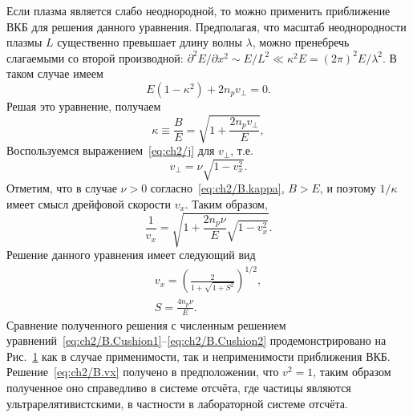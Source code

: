 Если плазма является слабо неоднородной, то можно применить приближение ВКБ для решения данного уравнения.
Предполагая, что масштаб неоднородности плазмы $L$ существенно превышает длину волны $\lambda$, можно пренебречь слагаемыми со второй производной: ${\partial^2E/\partial x^2 \sim E/L^2 \ll \kappa^2 E = (2\pi)^2E/\lambda^2}$.
В таком случае имеем
\begin{equation}
    E(1-\kappa^2)+2 n_p v_{\perp} = 0.
\end{equation}
Решая это уравнение, получаем
\begin{equation}
    \label{eq:ch2/B.kappa}
    \kappa \equiv \frac{B}{E}=\sqrt{1+\frac{2 n_p v_{\perp}}{E}},
\end{equation}
Воспользуемся выражением~\eqref{eq:ch2/j} для $v_\perp$, т.е.
\begin{equation}
v_\perp = \nu \sqrt{1-v_x^2}.
\label{vp}
\end{equation}
Отметим, что в случае $\nu>0$ согласно~\eqref{eq:ch2/B.kappa}, $B>E$, и поэтому $1/\kappa$ имеет смысл дрейфовой скорости $v_x$.
Таким образом,
\begin{equation}
    \frac{1}{v_x}=\sqrt{1+\frac{2n_p\nu}{E}\sqrt{1-v_x^2}} .
\end{equation}
Решение данного уравнения имеет следующий вид
\begin{gather}
    \label{eq:ch2/B.vx}
    v_x= {\left( \frac{2}{1+\sqrt{1+S^2}} \right)}^{1/2},\\
    S=\frac{4n_p\nu}{E}.
\end{gather}
Сравнение полученного решения с численным решением уравнений~\eqref{eq:ch2/B.Cushion1}--\eqref{eq:ch2/B.Cushion2} продемонстрировано на Рис.~\ref{fig.ch2/sec3/ED} как в случае применимости, так и неприменимости приближения ВКБ.
Решение~\eqref{eq:ch2/B.vx} получено в предположении, что $v^2 = 1$, таким образом полученное оно справедливо в системе отсчёта, где частицы являются ультрарелятивистскими, в частности в лабораторной системе отсчёта. 

\begin{figure}
	\caption[Дрейфовая скорость частиц в электрон-позитронной плазме]{\label{fig.ch2/sec3/ED} 
    }
\end{figure}

